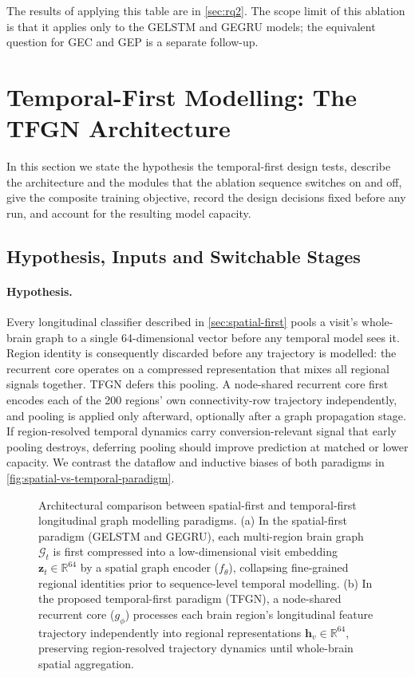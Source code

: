 The results of applying this table are in \autoref{sec:rq2}. The scope limit of this
ablation is that it applies only to the \ac{GELSTM} and \ac{GEGRU} models; the
equivalent question for \ac{GEC} and \ac{GEP} is a separate follow-up.

\section{Temporal-First Modelling: The TFGN Architecture}\label{sec:tfgn}

In this section we state the hypothesis the temporal-first design tests, describe the
architecture and the modules that the ablation sequence switches on and off, give the
composite training objective, record the design decisions fixed before any run, and
account for the resulting model capacity.

\subsection{Hypothesis, Inputs and Switchable Stages}\label{sec:tfgn-architecture}

\paragraph{Hypothesis.}
Every longitudinal classifier described in \autoref{sec:spatial-first} pools a visit's
whole-brain graph to a single 64-dimensional vector before any temporal model sees it.
Region identity is consequently discarded before any trajectory is modelled: the recurrent
core operates on a compressed representation that mixes all regional signals together.
\ac{TFGN} defers this pooling. A node-shared recurrent core first encodes each of the 200
regions' own connectivity-row trajectory independently, and pooling is applied only
afterward, optionally after a graph propagation stage. If region-resolved temporal dynamics
carry conversion-relevant signal that early pooling destroys, deferring pooling should
improve prediction at matched or lower capacity. We contrast the dataflow and inductive biases of both paradigms in \autoref{fig:spatial-vs-temporal-paradigm}.

\begin{figure}
  \centering
  \resizebox{0.92\linewidth}{!}{}
  \caption{Architectural comparison between spatial-first and temporal-first longitudinal graph modelling paradigms. (a) In the spatial-first paradigm (\ac{GELSTM} and \ac{GEGRU}), each multi-region brain graph $\mathcal{G}_t$ is first compressed into a low-dimensional visit embedding $\mathbf{z}_t \in \mathbb{R}^{64}$ by a spatial graph encoder ($f_\theta$), collapsing fine-grained regional identities prior to sequence-level temporal modelling. (b) In the proposed temporal-first paradigm (\ac{TFGN}), a node-shared recurrent core ($g_\phi$) processes each brain region's longitudinal feature trajectory independently into regional representations $\mathbf{h}_v \in \mathbb{R}^{64}$, preserving region-resolved trajectory dynamics until whole-brain spatial aggregation.}
  \label{fig:spatial-vs-temporal-paradigm}
\end{figure}

